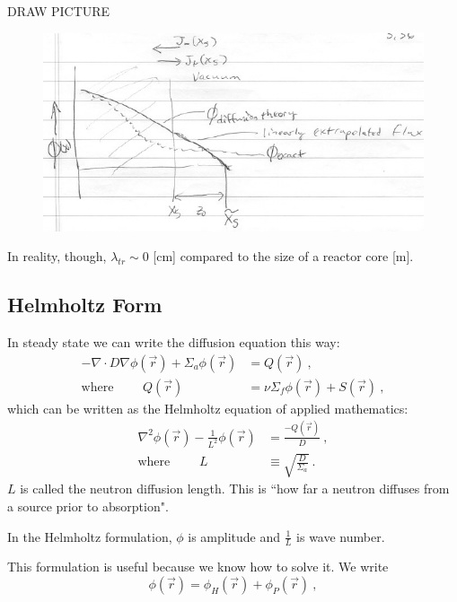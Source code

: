\documentclass[12pt]{article}
\begin{document}
DRAW PICTURE
%
\begin{figure}[h!]
\begin{center}
\includegraphics[height=3 in]{DiffusionBC}
\end{center}
\end{figure}

In reality, though, $\lambda_{tr} \sim 0$ [cm] compared to the size of a reactor core [m]. 


\subsection*{Helmholtz Form}
In steady state we can write the diffusion equation this way:
%
\begin{align*}
-\nabla \cdot D\nabla \phi(\vec{r}) + 
\Sigma_a \phi(\vec{r}) &= Q(\vec{r})\:, \\
%
\text{where }\qquad Q(\vec{r}) &=
\nu \Sigma_f \phi(\vec{r}) +
S(\vec{r})\:,
\end{align*}
%
which can be written as the Helmholtz equation of applied mathematics:
%
\begin{align*}
\nabla^2 \phi(\vec{r}) - \frac{1}{L^2}\phi(\vec{r}) &= \frac{-Q(\vec{r})}{D}\:, \\
\text{where }\qquad L &\equiv \sqrt{\frac{D}{\Sigma_a}}\:.
\end{align*}
%
$L$ is called the neutron diffusion length. This is ``how far a neutron diffuses from a source prior to absorption". 

In the Helmholtz formulation, $\phi$ is amplitude and $\frac{1}{L}$ is wave number. 

This formulation is useful because we know how to solve it. We write
\[\phi(\vec{r}) = \phi_H(\vec{r}) + \phi_P(\vec{r}) \:,\]
\end{document}
